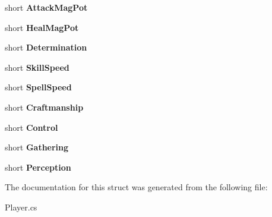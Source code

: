 \begin{DoxyCompactItemize}
\item 
\hypertarget{structffxivlib_1_1_player_1_1_p_l_a_y_e_r_i_n_f_o_a82a84c20248f3b4697cdc0efbe115aaf}{short {\bfseries Attack\-Mag\-Pot}}\label{structffxivlib_1_1_player_1_1_p_l_a_y_e_r_i_n_f_o_a82a84c20248f3b4697cdc0efbe115aaf}

\item 
\hypertarget{structffxivlib_1_1_player_1_1_p_l_a_y_e_r_i_n_f_o_aa3672b08ab0dcf943814b39adc3684de}{short {\bfseries Heal\-Mag\-Pot}}\label{structffxivlib_1_1_player_1_1_p_l_a_y_e_r_i_n_f_o_aa3672b08ab0dcf943814b39adc3684de}

\item 
\hypertarget{structffxivlib_1_1_player_1_1_p_l_a_y_e_r_i_n_f_o_a808248c6e0a41b393bdc2aae1874ea8e}{short {\bfseries Determination}}\label{structffxivlib_1_1_player_1_1_p_l_a_y_e_r_i_n_f_o_a808248c6e0a41b393bdc2aae1874ea8e}

\item 
\hypertarget{structffxivlib_1_1_player_1_1_p_l_a_y_e_r_i_n_f_o_ab311411afe59aa5562b5f122fe97ca78}{short {\bfseries Skill\-Speed}}\label{structffxivlib_1_1_player_1_1_p_l_a_y_e_r_i_n_f_o_ab311411afe59aa5562b5f122fe97ca78}

\item 
\hypertarget{structffxivlib_1_1_player_1_1_p_l_a_y_e_r_i_n_f_o_acfca12f84244ffa407a78af2914b63fc}{short {\bfseries Spell\-Speed}}\label{structffxivlib_1_1_player_1_1_p_l_a_y_e_r_i_n_f_o_acfca12f84244ffa407a78af2914b63fc}

\item 
\hypertarget{structffxivlib_1_1_player_1_1_p_l_a_y_e_r_i_n_f_o_a132cc5dcd38950cf69ba96092c9ff817}{short {\bfseries Craftmanship}}\label{structffxivlib_1_1_player_1_1_p_l_a_y_e_r_i_n_f_o_a132cc5dcd38950cf69ba96092c9ff817}

\item 
\hypertarget{structffxivlib_1_1_player_1_1_p_l_a_y_e_r_i_n_f_o_adda7db7f5b2a2b74875cb56243d16cf2}{short {\bfseries Control}}\label{structffxivlib_1_1_player_1_1_p_l_a_y_e_r_i_n_f_o_adda7db7f5b2a2b74875cb56243d16cf2}

\item 
\hypertarget{structffxivlib_1_1_player_1_1_p_l_a_y_e_r_i_n_f_o_a06313cc141a14de1f3bfc07470192a3a}{short {\bfseries Gathering}}\label{structffxivlib_1_1_player_1_1_p_l_a_y_e_r_i_n_f_o_a06313cc141a14de1f3bfc07470192a3a}

\item 
\hypertarget{structffxivlib_1_1_player_1_1_p_l_a_y_e_r_i_n_f_o_afaa389295165211145f21e766cf35ed7}{short {\bfseries Perception}}\label{structffxivlib_1_1_player_1_1_p_l_a_y_e_r_i_n_f_o_afaa389295165211145f21e766cf35ed7}

\end{DoxyCompactItemize}


The documentation for this struct was generated from the following file\-:\begin{DoxyCompactItemize}
\item 
Player.\-cs\end{DoxyCompactItemize}
